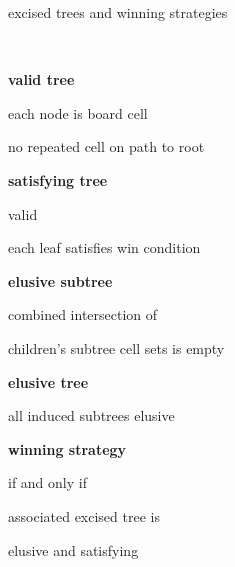 \noindent
excised trees and winning strategies

\


{\it
\bitz
\item {\bf valid tree}
  \bitz
  \item each node is board cell
  \item no repeated cell on path to root
  \eitz
\item {\bf satisfying tree} 
  \bitz
  \item valid
  \item each leaf satisfies win condition
  \eitz
\item {\bf elusive subtree} 

combined intersection of 

children's subtree cell sets is empty
\item {\bf elusive tree} 

all induced subtrees elusive
\item {\bf winning strategy} 

if and only if

associated excised tree is 

elusive and satisfying
\eitz
}
